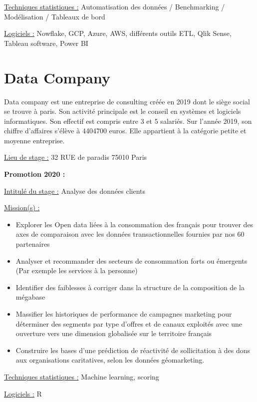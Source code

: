 \documentclass[
  letterpaper,
  DIV=11,
  numbers=noendperiod]{scrreprt}
\begin{document}
\uline{Techniques statistiques :} Automatisation des données /
Benchmarking / Modélisation / Tableaux de bord

\uline{Logiciels :} Nowflake, GCP, Azure, AWS, différents outils ETL,
Qlik Sense, Tableau software, Power BI

\hypertarget{data-company}{%
\section{\texorpdfstring{\textbf{Data
Company}}{Data Company}}\label{data-company}}

Data company est une entreprise de consulting créée en 2019 dont le
siège social se trouve à paris. Son activité principale est le conseil
en systèmes et logiciels informatiques. Son effectif est compris entre 3
et 5 salariés. Sur l'année 2019, son chiffre d'affaires s'élève à
4404700 euros. Elle appartient à la catégorie petite et moyenne
entreprise.

\uline{Lieu de stage :} 32 RUE de paradis 75010 Paris

\textbf{Promotion 2020 :}

\uline{Intitulé du stage :} Analyse des données clients

\uline{Mission(s) :}

\begin{itemize}
\item
  Explorer les Open data liées à la consommation des français pour
  trouver des axes de comparaison avec les données transactionnelles
  fournies par nos 60 partenaires
\item
  Analyser et recommander des secteurs de consommation forts ou
  émergents (Par exemple les services à la personne)
\item
  Identifier des faiblesses à corriger dans la structure de la
  composition de la mégabase
\item
  Massifier les historiques de performance de campagnes marketing pour
  déterminer des segments par type d'offres et de canaux exploités avec
  une ouverture vers une dimension globalisée sur le territoire français
\item
  Construire les bases d'une prédiction de réactivité de sollicitation à
  des dons aux organisations caritatives, selon les données
  géomarketing.
\end{itemize}

\uline{Techniques statistiques :} Machine learning, scoring

\uline{Logiciels :} R
\end{document}
